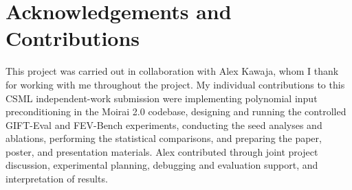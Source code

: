 \documentclass[11pt]{article}
\begin{document}
\section*{Acknowledgements and Contributions}

This project was carried out in collaboration with Alex Kawaja, whom I thank for working with me throughout the project. My individual contributions to this CSML independent-work submission were implementing polynomial input preconditioning in the Moirai 2.0 codebase, designing and running the controlled GIFT-Eval and FEV-Bench experiments, conducting the seed analyses and ablations, performing the statistical comparisons, and preparing the paper, poster, and presentation materials. Alex contributed through joint project discussion, experimental planning, debugging and evaluation support, and interpretation of results.



\end{document}
